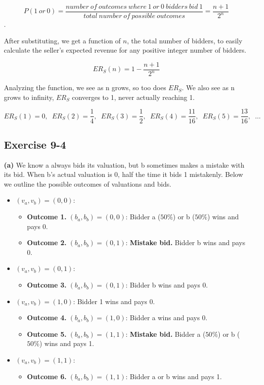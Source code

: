 \documentclass[twoside]{article}
\begin{document}
$$P(1\>or\>0) = \frac{number\>of\>outcomes\>where\>1\>or\>0\>bidders\>bid\>1}{total\>number\>of\>possible\>outcomes} = \frac{n + 1}{2^n}$$.

After substituting, we get a function of $n$, the total number of bidders, to easily calculate the seller's expected revenue for any positive integer number of bidders.

$$ER_{S}(n) = 1 - \frac{n + 1}{2^n}$$

Analyzing the function, we see as n grows, so too does $ER_{S}$. We also see as n grows to infinity, $ER_{S}$ converges to 1, never actually reaching 1.

$$ER_{S}(1) = 0, \;\;ER_{S}(2) = \frac{1}{4}, \;\;ER_{S}(3) = \frac{1}{2}, \;\;ER_{S}(4) = \frac{11}{16}, \;\;ER_{S}(5) = \frac{13}{16}, \;\;\ldots$$

\newpage
\subsection{Exercise 9-4}
{\bf(a)} We know a always bids its valuation, but b sometimes makes a mistake with its bid. When b's actual valuation is 0, half the time it bids 1 mistakenly. Below we outline the possible outcomes of valuations and bids.

\begin{itemize}
  \item $(v_{a}, v_{b}) = (0, 0)$:
  \begin{itemize}
    \item {\bf Outcome 1.} $(b_{a}, b_{b}) = (0, 0)$: Bidder a ($50\%$) or b ($50\%$) wins and pays 0.
    \item {\bf Outcome 2.} $(b_{a}, b_{b}) = (0, 1)$: {\bf Mistake bid.} Bidder b wins and pays 0.
  \end{itemize}
  \item $(v_{a}, v_{b}) = (0, 1)$:
  \begin{itemize}
    \item {\bf Outcome 3.} $(b_{a}, b_{b}) = (0, 1)$: Bidder b wins and pays 0.
  \end{itemize}
  \item $(v_{a}, v_{b}) = (1, 0)$: Bidder 1 wins and pays 0.
  \begin{itemize}
    \item {\bf Outcome 4.} $(b_{a}, b_{b}) = (1, 0)$: Bidder a wins and pays 0.
    \item {\bf Outcome 5.} $(b_{a}, b_{b}) = (1, 1)$: {\bf Mistake bid.} Bidder a ($50\%$) or b ($50\%$) wins and pays 1.
  \end{itemize}
  \item $(v_{a}, v_{b}) = (1, 1)$:
  \begin{itemize}
    \item {\bf Outcome 6.} $(b_{a}, b_{b}) = (1, 1)$: Bidder a or b wins and pays 1.
  \end{itemize}
\end{itemize}
\end{document}
